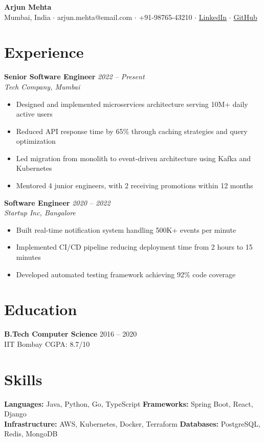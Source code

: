 \documentclass[11pt,a4paper]{article}
\begin{document}
\begin{center}
{\LARGE\bfseries Arjun Mehta}\\[4pt]
\small Mumbai, India $\cdot$ arjun.mehta@email.com $\cdot$ +91-98765-43210 $\cdot$ \href{https://linkedin.com/in/arjunmehta}{LinkedIn} $\cdot$ \href{https://github.com/arjunmehta}{GitHub}
\end{center}
\section{Experience}
\textbf{Senior Software Engineer} \hfill \textit{2022 -- Present}\\
\textit{Tech Company, Mumbai}
\begin{itemize}
\item Designed and implemented microservices architecture serving 10M+ daily active users
\item Reduced API response time by 65\% through caching strategies and query optimization
\item Led migration from monolith to event-driven architecture using Kafka and Kubernetes
\item Mentored 4 junior engineers, with 2 receiving promotions within 12 months
\end{itemize}
\textbf{Software Engineer} \hfill \textit{2020 -- 2022}\\
\textit{Startup Inc, Bangalore}
\begin{itemize}
\item Built real-time notification system handling 500K+ events per minute
\item Implemented CI/CD pipeline reducing deployment time from 2 hours to 15 minutes
\item Developed automated testing framework achieving 92\% code coverage
\end{itemize}
\section{Education}
\textbf{B.Tech Computer Science} \hfill 2016 -- 2020\\
IIT Bombay \hfill CGPA: 8.7/10
\section{Skills}
\textbf{Languages:} Java, Python, Go, TypeScript \quad \textbf{Frameworks:} Spring Boot, React, Django\\
\textbf{Infrastructure:} AWS, Kubernetes, Docker, Terraform \quad \textbf{Databases:} PostgreSQL, Redis, MongoDB
\end{document}
